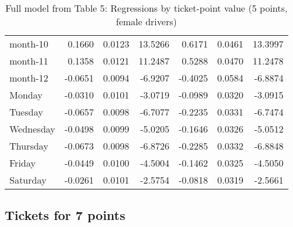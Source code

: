 \documentclass[10pt]{article}
\begin{document}
\begin{table}[ht]
\begin{tabular}{lrrrrrr}
  month-10 & 0.1660 & 0.0123 & 13.5266 & 0.6171 & 0.0461 & 13.3997 \\ 
  month-11 & 0.1358 & 0.0121 & 11.2487 & 0.5288 & 0.0470 & 11.2478 \\ 
  month-12 & -0.0651 & 0.0094 & -6.9207 & -0.4025 & 0.0584 & -6.8874 \\ 
  Monday & -0.0310 & 0.0101 & -3.0719 & -0.0989 & 0.0320 & -3.0915 \\ 
  Tuesday & -0.0657 & 0.0098 & -6.7077 & -0.2235 & 0.0331 & -6.7474 \\ 
  Wednesday & -0.0498 & 0.0099 & -5.0205 & -0.1646 & 0.0326 & -5.0512 \\ 
  Thursday & -0.0673 & 0.0098 & -6.8726 & -0.2285 & 0.0332 & -6.8848 \\ 
  Friday & -0.0449 & 0.0100 & -4.5004 & -0.1462 & 0.0325 & -4.5050 \\ 
  Saturday & -0.0261 & 0.0101 & -2.5754 & -0.0818 & 0.0319 & -2.5661 \\ 
   \hline
\end{tabular}
\caption{Full model from Table 5: Regressions by ticket-point value (5 points, female drivers)} 
\label{tab_5_5_pts_no_age_F}
\end{table}


\clearpage
\pagebreak




\subsection{Tickets for 7 points}



\end{document}
